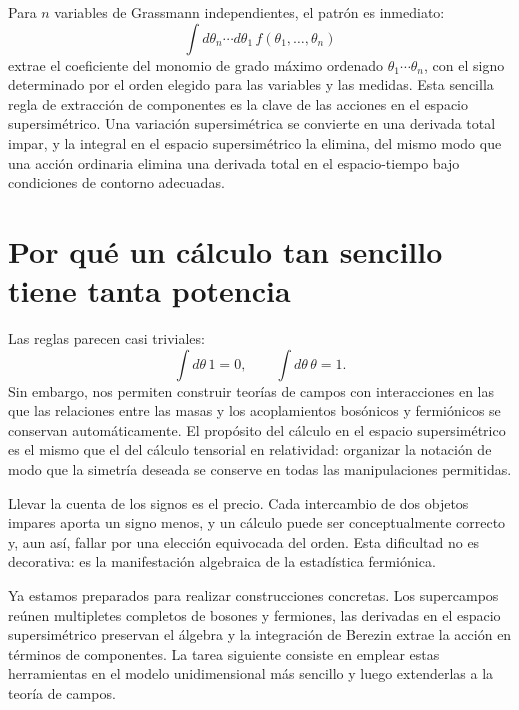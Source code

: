 Para \(n\) variables de Grassmann independientes, el patrón es inmediato:
\begin{equation}
\int d\theta_n\cdots d\theta_1\,
f(\theta_1,\ldots,\theta_n)
\end{equation}
extrae el coeficiente del monomio de grado máximo ordenado
\(\theta_1\cdots\theta_n\), con el signo determinado por el orden elegido para las variables y las medidas. Esta sencilla regla de extracción de componentes es la clave de las acciones en el espacio supersimétrico. Una variación supersimétrica se convierte en una derivada total impar, y la integral en el espacio supersimétrico la elimina, del mismo modo que una acción ordinaria elimina una derivada total en el espacio-tiempo bajo condiciones de contorno adecuadas.

\section{Por qué un cálculo tan sencillo tiene tanta potencia}

Las reglas parecen casi triviales:
\begin{equation}
\int d\theta\,1=0,
\qquad
\int d\theta\,\theta=1.
\end{equation}
Sin embargo, nos permiten construir teorías de campos con interacciones en las que las relaciones entre las masas y los acoplamientos bosónicos y fermiónicos se conservan automáticamente. El propósito del cálculo en el espacio supersimétrico es el mismo que el del cálculo tensorial en relatividad: organizar la notación de modo que la simetría deseada se conserve en todas las manipulaciones permitidas.

Llevar la cuenta de los signos es el precio. Cada intercambio de dos objetos impares aporta un signo menos, y un cálculo puede ser conceptualmente correcto y, aun así, fallar por una elección equivocada del orden. Esta dificultad no es decorativa: es la manifestación algebraica de la estadística fermiónica.

\begin{classroomqa}
\end{classroomqa}

Ya estamos preparados para realizar construcciones concretas. Los supercampos reúnen multipletes completos de bosones y fermiones, las derivadas en el espacio supersimétrico preservan el álgebra y la integración de Berezin extrae la acción en términos de componentes. La tarea siguiente consiste en emplear estas herramientas en el modelo unidimensional más sencillo y luego extenderlas a la teoría de campos.
